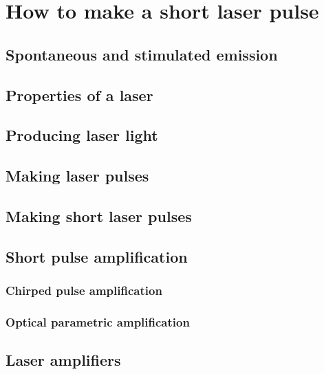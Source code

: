 \chapter{How to make a short laser pulse}\label{ch:MakeShortPulse}

\section{Spontaneous and stimulated emission}
\section{Properties of a laser}
\section{Producing laser light}
\section{Making laser pulses}
\section{Making short laser pulses}
\section{Short pulse amplification}
\subsection{Chirped pulse amplification}
\subsection{Optical parametric amplification}
\section{Laser amplifiers}